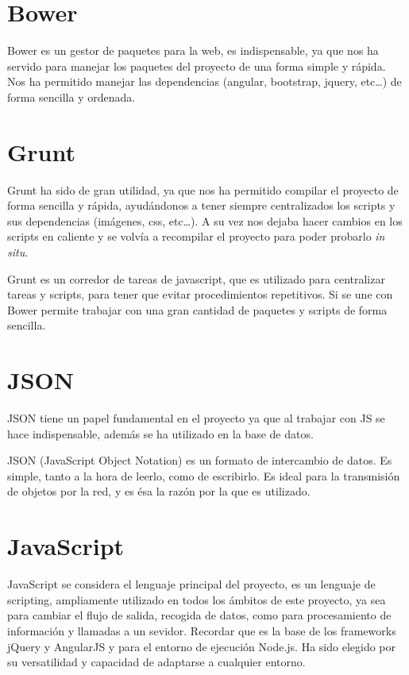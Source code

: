 \section{Bower}\label{Bower}

Bower es un gestor de paquetes para la web, es indispensable, ya que nos ha servido para manejar los paquetes del proyecto de una forma simple y rápida. Nos ha permitido manejar las dependencias (angular, bootstrap, jquery, etc\ldots) de forma sencilla y ordenada. 

\section{Grunt}\label{Grunt}

Grunt ha sido de gran utilidad, ya que nos ha permitido compilar el proyecto de forma sencilla y rápida, ayudándonos a tener siempre centralizados los scripts y sus dependencias (imágenes, css, etc\ldots ). A su vez nos dejaba hacer cambios en los scripts en caliente y se volvía a recompilar el proyecto para poder probarlo \textit{in situ}.

Grunt es un corredor de tareas de javascript, que es utilizado para centralizar tareas y scripts, para tener que evitar procedimientos repetitivos. Si se une con Bower permite trabajar con una gran cantidad de paquetes y scripts de forma sencilla.

\section{JSON}\label{JSON}
JSON tiene un papel fundamental en el proyecto ya que al trabajar con JS se hace indispensable, además se ha utilizado en la base de datos.

JSON (JavaScript Object Notation) es un formato de intercambio de datos. Es simple, tanto a  la  hora de leerlo, como de escribirlo. Es ideal para la transmisión de objetos por la red, y es ésa la razón por la que es utilizado.

\section{JavaScript}\label{JavaScript}

JavaScript se considera el lenguaje principal del proyecto, es un lenguaje de scripting, ampliamente utilizado en todos los ámbitos de este proyecto, ya sea para cambiar el flujo de salida, recogida de datos, como para procesamiento de información y llamadas a un sevidor. Recordar que es la base de los frameworks jQuery y AngularJS y para el entorno de ejecución Node.js. Ha sido elegido por su versatilidad y capacidad de adaptarse a cualquier entorno.

